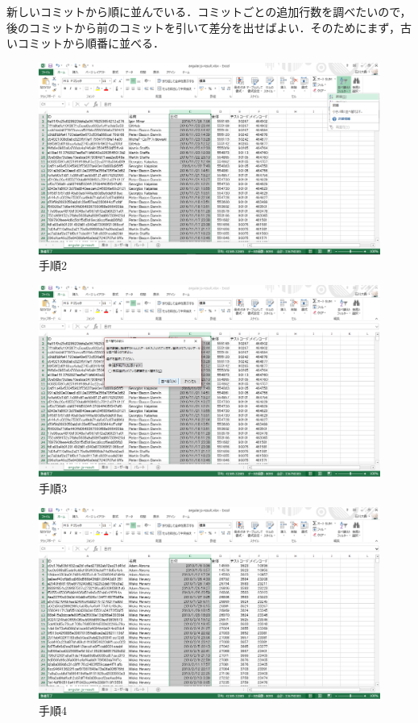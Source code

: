\newpage

新しいコミットから順に並んでいる．コミットごとの追加行数を調べたいので，後のコミットから前のコミットを引いて差分を出せばよい．そのためにまず，古いコミットから順番に並べる．

\begin{figure}[h]
\centering
\includegraphics[width=13cm]{process2.png}
\caption{手順2}
\end{figure}

\begin{figure}[h]
\centering
\includegraphics[width=13cm]{process3.png}
\caption{手順3}
\end{figure}

\begin{figure}[h]
\centering
\includegraphics[width=13cm]{process4.png}
\caption{手順4}
\end{figure}

